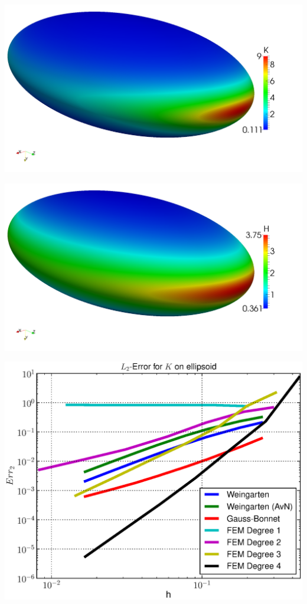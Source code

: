 \documentclass{beamer}
\begin{document}
\begin{frame}
\begin{overprint}
\begin{minipage}[t]{0.49\textwidth}
          \end{minipage}
           \begin{minipage}[t]{0.49\textwidth}
              \centering\includegraphics[width=\textwidth]{bilder/Curvature/heineC/K2k.png}
            \end{minipage}\hfill
            \begin{minipage}[t]{0.49\textwidth}
              \centering\includegraphics[width=\textwidth]{bilder/Curvature/heineC/H2k.png}
            \end{minipage}
          \begin{minipage}[t]{0.49\textwidth}
            \centering\includegraphics[width=\textwidth]{bilder/Curvature/heineC/ErrKL2.eps}

\end{minipage}
\end{overprint}
\end{frame}
\end{document}
